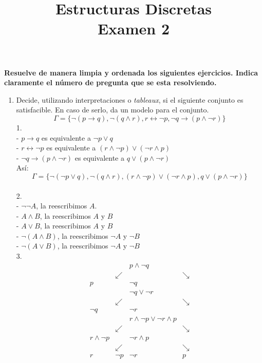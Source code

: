 \documentclass[a4paper,10pt]{article}
\title{Estructuras Discretas\\Examen 2}
\begin{document}
\maketitle

\vspace{-15pt}
\noindent \textbf{Resuelve de manera limpia y ordenada los siguientes ejercicios. 
Indica claramente el n\'umero de pregunta que se esta resolviendo.}


\begin{enumerate}	
		
	\item {}
		Decide, utilizando interpretaciones o \textit{tableaux}, si el siguiente conjunto es satisfacible. En caso de serlo, da un modelo para el conjunto. 
		$$\Gamma = \{ \neg (p \to q), \neg(q \land r), r \leftrightarrow \neg p, \neg q \to ( p \land \neg r) \}$$
1. \\
   - \(p \rightarrow q\) es equivalente a \(\neg p \vee q\)\\
   - \(r \leftrightarrow \neg p\) es equivalente a \((r \wedge \neg p) \vee (\neg r \wedge p)\)\\
   - \(\neg q \rightarrow (p \wedge \neg r)\) es equivalente a \(q \vee (p \wedge \neg r)\)\\
   Así:\\
   \[
   \Gamma=\{\neg(\neg p \vee q), \neg(q \wedge r), (r \wedge \neg p) \vee (\neg r \wedge p), q \vee (p \wedge \neg r)\}
   \] \\
2.\\
   - \(\neg\neg A\), la reescribimos \(A\).\\
   - \(A \wedge B\), la reescribimos \(A\) y \(B\)\\
   - \(A \vee B\), la reescribimos \(A\) y \(B\) \\
   - \(\neg(A \wedge B)\), la reescribimos \(\neg A\) y \(\neg B\) \\
   - \(\neg(A \vee B)\), la reescribimos \(\neg A\) y \(\neg B\)\\
3.\\
   \[
   \begin{array}{cccc}
   & & p \wedge \neg q & \\
   & \swarrow & & \searrow \\
   p & & \neg q & \\
   & & \neg q \vee \neg r & \\
   & \swarrow & & \searrow \\
   \neg q & & \neg r & \\
   & & r \wedge \neg p \vee \neg r \wedge p & \\
   & \swarrow & & \searrow \\
   r \wedge \neg p & & \neg r \wedge p & \\
   & \swarrow & & \searrow \\
   r & \neg p & \neg r & p \\
   \end{array}
   \]


\end{enumerate}
\end{document}
